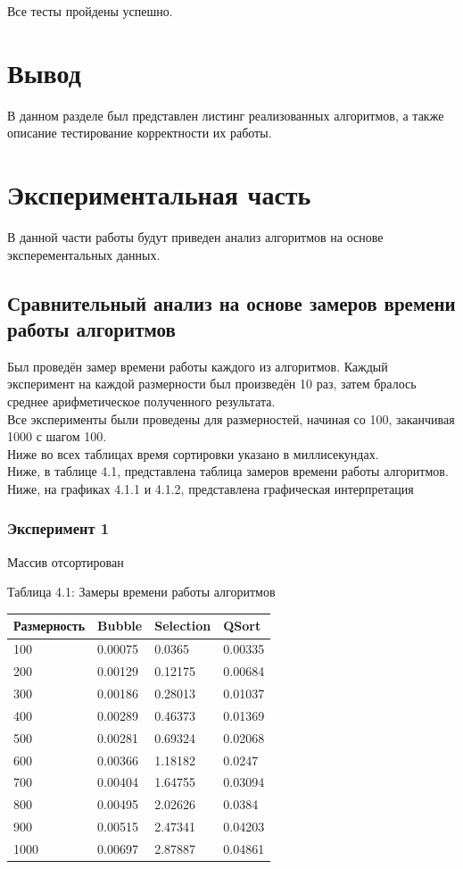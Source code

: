 \documentclass[12pt,a4paper]{article}
\numberwithin{equation}{section}
\begin{document}
Все тесты пройдены успешно.

\section*{Вывод}
\qquad В данном разделе был представлен листинг реализованных алгоритмов, а также описание тестирование корректности их работы.
\clearpage

\section{Экспериментальная часть}
\qquad В данной части работы будут приведен анализ алгоритмов на основе эксперементальных данных.
\subsection{Сравнительный анализ на основе замеров времени работы алгоритмов}
\qquad Был проведён замер времени работы каждого из алгоритмов. Каждый эксперимент на каждой размерности был произведён 10 раз, затем бралось среднее арифметическое полученного результата.\\
\qquad Все эксперименты были проведены для размерностей, начиная со 100, заканчивая 1000 с шагом 100.\\
\qquad Ниже во всех таблицах время сортировки указано в миллисекундах.\\
\qquad Ниже, в таблице 4.1, представлена таблица замеров времени работы алгоритмов.\\
\qquad Ниже, на графиках 4.1.1 и 4.1.2, представлена графическая интерпретация\\
\subsubsection{Эксперимент 1}
\qquad Массив отсортирован
\begin{center}
	Таблица 4.1: Замеры времени работы алгоритмов
	\begin{tabular}{| l | | l | l | l |}
		\hline
		Размерность & Bubble & Selection & QSort\\\hline
		100  & 0.00075 & 0.0365  & 0.00335 \\\hline
		200  & 0.00129 & 0.12175 & 0.00684 \\\hline
		300  & 0.00186 & 0.28013 & 0.01037 \\\hline
		400  & 0.00289 & 0.46373 & 0.01369 \\\hline
		500  & 0.00281 & 0.69324 & 0.02068 \\\hline
		600  & 0.00366 & 1.18182 & 0.0247 \\\hline
		700  & 0.00404 & 1.64755 & 0.03094 \\\hline
		800  & 0.00495 & 2.02626 & 0.0384 \\\hline
		900  & 0.00515 & 2.47341 & 0.04203 \\\hline
		1000 & 0.00697 & 2.87887 & 0.04861\\\hline
	\end{tabular}
\end{center}
\end{document}

